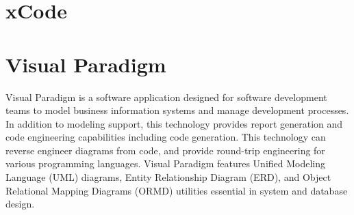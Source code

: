     \section{xCode}
    \section{Visual Paradigm}
    Visual Paradigm is a software application designed for software development teams to model business information systems and manage development processes. In addition to modeling support, this technology provides report generation and code engineering capabilities including code generation. This technology can reverse engineer diagrams from code, and provide round-trip engineering for various programming languages. Visual Paradigm features Unified Modeling Language (UML) diagrams, Entity Relationship Diagram (ERD), and Object Relational Mapping Diagrams (ORMD) utilities essential in system and database design.